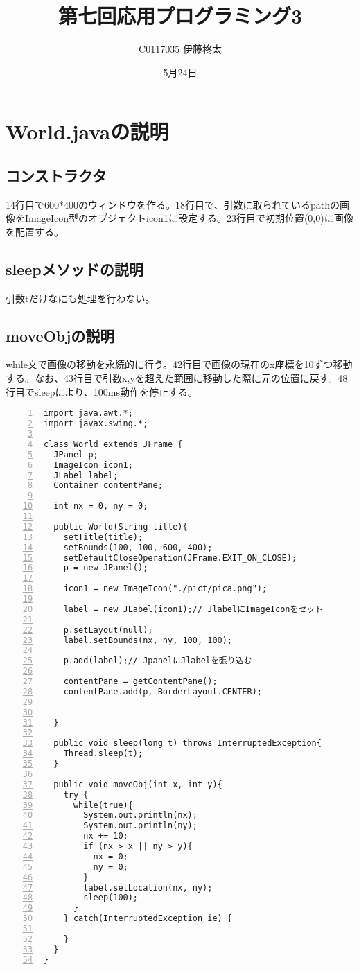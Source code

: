 \documentclass[uplatex]{jsarticle}
\title{第七回応用プログラミング3}
\author{C0117035 伊藤柊太}
\date{5月24日}
\begin{document}
\maketitle

\section{World.javaの説明}
\subsection{コンストラクタ}
14行目で600*400のウィンドウを作る。18行目で、引数に取られているpathの画像をImageIcon型のオブジェクトicon1に設定する。23行目で初期位置(0,0)に画像を配置する。

\subsection{sleepメソッドの説明}
引数tだけなにも処理を行わない。

\subsection{moveObjの説明}
while文で画像の移動を永続的に行う。42行目で画像の現在のx座標を10ずつ移動する。なお、43行目で引数x,yを超えた範囲に移動した際に元の位置に戻す。48行目でsleepにより、100ms動作を停止する。

\begin{lstlisting}[caption=World.java,numbers = left]
import java.awt.*;
import javax.swing.*;

class World extends JFrame {
  JPanel p;
  ImageIcon icon1;
  JLabel label;
  Container contentPane;

  int nx = 0, ny = 0;

  public World(String title){
    setTitle(title);
    setBounds(100, 100, 600, 400);
    setDefaultCloseOperation(JFrame.EXIT_ON_CLOSE);
    p = new JPanel();

    icon1 = new ImageIcon("./pict/pica.png");

    label = new JLabel(icon1);// JlabelにImageIconをセット

    p.setLayout(null);
    label.setBounds(nx, ny, 100, 100);

    p.add(label);// JpanelにJlabelを張り込む

    contentPane = getContentPane();
    contentPane.add(p, BorderLayout.CENTER);


  }

  public void sleep(long t) throws InterruptedException{
    Thread.sleep(t);
  }

  public void moveObj(int x, int y){
    try {
      while(true){
        System.out.println(nx);
        System.out.println(ny);
        nx += 10;
        if (nx > x || ny > y){
          nx = 0;
          ny = 0;
        }
        label.setLocation(nx, ny);
        sleep(100);
      }
    } catch(InterruptedException ie) {

    }
  }
}
\end{lstlisting}
\end{document}

